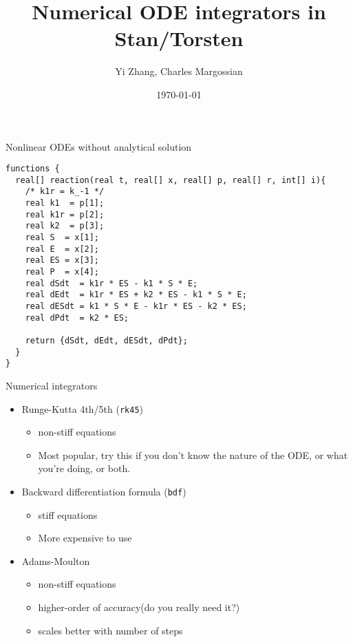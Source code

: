 \documentclass[presentation]{beamer}
\author{Yi Zhang, Charles Margossian}
\date{\today}
\title{Numerical ODE integrators in Stan/Torsten}
\begin{document}
\maketitle

\begin{frame}[fragile,label={sec:orgf37a7fe}]{Nonlinear ODEs without analytical solution}
 \begin{verbatim}
functions {
  real[] reaction(real t, real[] x, real[] p, real[] r, int[] i){
    /* k1r = k_-1 */
    real k1  = p[1];
    real k1r = p[2];
    real k2  = p[3];
    real S  = x[1];
    real E  = x[2];
    real ES = x[3];
    real P  = x[4];
    real dSdt  = k1r * ES - k1 * S * E;
    real dEdt  = k1r * ES + k2 * ES - k1 * S * E;
    real dESdt = k1 * S * E - k1r * ES - k2 * ES;
    real dPdt  = k2 * ES;

    return {dSdt, dEdt, dESdt, dPdt};
  }
}
\end{verbatim}
\end{frame}

\begin{frame}[fragile,label={sec:orgca44523}]{Numerical integrators}
 \begin{itemize}
\item Runge-Kutta 4th/5th (\texttt{rk45})
\begin{itemize}
\item non-stiff equations
\item Most popular, try this if you don't know the nature of the ODE, or what you're doing, or both.
\end{itemize}
\item Backward differentiation formula (\texttt{bdf})
\begin{itemize}
\item stiff equations
\item More expensive to use
\end{itemize}
\item Adams-Moulton
\begin{itemize}
\item non-stiff equations
\item higher-order of accuracy(do you really need it?)
\item scales better with number of steps
\end{itemize}
\end{itemize}
\end{frame}
\end{document}

